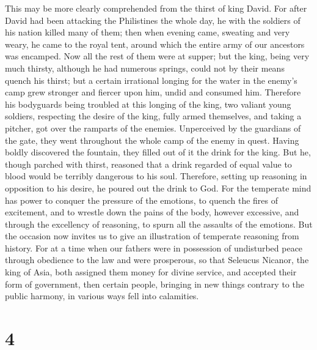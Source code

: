  This may be more clearly comprehended from the thirst of
king David.  For after David had been attacking the
Philistines the whole day, he with the soldiers of his nation killed
many of them;  then when evening came, sweating and very
weary, he came to the royal tent, around which the entire army of our
ancestors was encamped.  Now all the rest of them were at
supper;  but the king, being very much thirsty, although
he had numerous springs, could not by their means quench his thirst;
 but a certain irrational longing for the water in the
enemy's camp grew stronger and fiercer upon him, undid and consumed him.
 Therefore his bodyguards being troubled at this longing
of the king, two valiant young soldiers, respecting the desire of the
king, fully armed themselves, and taking a pitcher, got over the
ramparts of the enemies.  Unperceived by the guardians of
the gate, they went throughout the whole camp of the enemy in quest.
 Having boldly discovered the fountain, they filled out
of it the drink for the king.  But he, though parched
with thirst, reasoned that a drink regarded of equal value to blood
would be terribly dangerous to his soul.  Therefore,
setting up reasoning in opposition to his desire, he poured out the
drink to God.  For the temperate mind has power to
conquer the pressure of the emotions, to quench the fires of excitement,
 and to wrestle down the pains of the body, however
excessive, and through the excellency of reasoning, to spurn all the
assaults of the emotions.  But the occasion now invites
us to give an illustration of temperate reasoning from history.
 For at a time when our fathers were in possession of
undisturbed peace through obedience to the law and were prosperous, so
that Seleucus Nicanor, the king of Asia, both assigned them money for
divine service, and accepted their form of government, 
then certain people, bringing in new things contrary to the public
harmony, in various ways fell into calamities.

\hypertarget{section-3}{%
\section{4}\label{section-3}}

